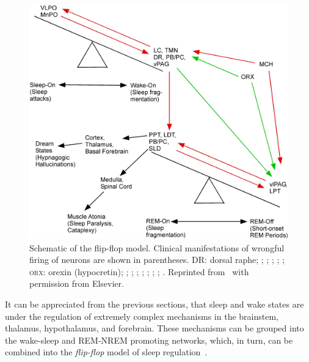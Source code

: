             \begin{figure}[tb]
                \includegraphics[width=\textwidth]{figures/clinical-background/SleepStateSwitching/Figure5.png}
                \caption[Schematic of the flip-flop model]{Schematic of the flip-flop model. Clinical manifestations of wrongful firing of neurons are shown in parentheses. %
                {\scriptsize{DR}}: dorsal raphe; %
                ; %
                ; %
                ; %
                ; %
                ; %
                \textsc{orx}: orexin (hypocretin); %
                ; %
                ; %
                ; %
                ; %
                ; %
                ; %
                ; %
                . %
                Reprinted from~\cite{Saper2010} with permission from Elsevier.}
                \label{fig:clinical-background:flipflop}
            \end{figure}
            
            It can be appreciated from the previous sections, that sleep and wake states are under the regulation of extremely complex mechanisms in the brainstem, thalamus, hypothalamus, and forebrain.
            These mechanisms can be grouped into the wake-sleep and \ac{REM}-\ac{NREM} promoting networks, which, in turn, can be combined into the \textit{flip-flop} model of sleep regulation~\cite{Saper2001, Saper2005, Saper2010}.
            
